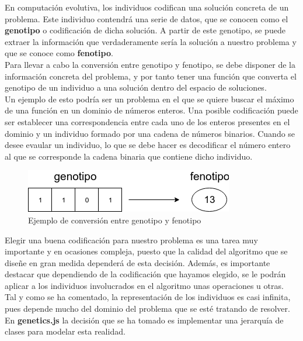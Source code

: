 En computación evolutiva, los individuos codifican una solución concreta de un problema. Este individuo contendrá una serie de datos, que se conocen como el \textbf{genotipo} o codificación de dicha solución. A partir de este genotipo, se puede extraer la información que verdaderamente sería la solución a nuestro problema y que se conoce como \textbf{fenotipo}. \\

Para llevar a cabo la conversión entre genotipo y fenotipo, se debe disponer de la información concreta del problema, y por tanto tener una función que converta el genotipo de un individuo a una solución dentro del espacio de soluciones. \\

Un ejemplo de esto podría ser un problema en el que se quiere buscar el máximo de una función en un dominio de números enteros. Una posible codificación puede ser establecer una correspondencia entre cada uno de los enteros presentes en el dominio y un individuo formado por una cadena de números binarios. Cuando se desee evaular un individuo, lo que se debe hacer es decodificar el número entero al que se corresponde la cadena binaria que contiene dicho individuo. \\

\begin{figure}[H]
    \centering
    \includegraphics[scale=0.5]{mem/images/cap-4/4.2.2(Individuos)/Individuos-1.png}
    \caption{Ejemplo de conversión entre genotipo y fenotipo}
    \label{fig:example1}
\end{figure}

Elegir una buena codificación para nuestro problema es una tarea muy importante y en ocasiones compleja, puesto que la calidad del algoritmo que se diseñe en gran medida dependerá de esta decisión. Además, es importante destacar que dependiendo de la codificación que hayamos elegido, se le podrán aplicar a los individuos involucrados en el algoritmo unas operaciones u otras. \\

Tal y como se ha comentado, la representación de los individuos es casi infinita, pues depende mucho del dominio del problema que se esté tratando de resolver. En \textbf{genetics.js} la decisión que se ha tomado es implementar una jerarquía de clases para modelar esta realidad. \\

